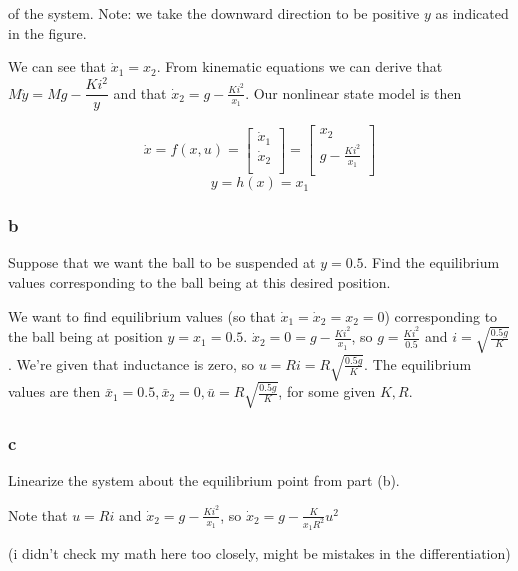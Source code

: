 \documentclass[11pt]{article}
\begin{document}
of the system. Note: we take the downward direction to be positive $y$ as indicated in the figure.

We can see that $\dot x_1 = x_2$. From kinematic equations we can derive that $M \ddot y = Mg - \dfrac{Ki^2}{y}$ and that $\dot x_2 = g - \frac{Ki^2}{x_1}$. Our nonlinear state model is then

\[
    \dot x = f(x, u) =
    \begin{bmatrix}
        \dot x_1 \\
        \dot x_2 \\
    \end{bmatrix}
    =
    \begin{bmatrix}
        x_2 \\
        g - \frac{Ki^2}{x_1} \\
    \end{bmatrix}
\]
\[ y = h(x) = x_1 \]

\subsubsection{b}

Suppose that we want the ball to be suspended at $y = 0.5$. Find the equilibrium values corresponding to the ball being at this desired position.

We want to find equilibrium values (so that $\dot x_1 = \dot x_2 = x_2 = 0$) corresponding to the ball being at position $y = x_1 = 0.5$. $\dot x_2 = 0 = g - \frac{Ki^2}{x_1}$, so $g = \frac{Ki^2}{0.5}$ and $i = \sqrt{\frac{0.5g}{K}}$. We're given that inductance is zero, so $u = Ri = R \sqrt{\frac{0.5g}{K}}$. The equilibrium values are then $\bar x_1 = 0.5, \bar x_2 = 0, \bar u = R \sqrt{\frac{0.5g}{K}}$, for some given $K, R$.

\subsubsection{c}

Linearize the system about the equilibrium point from part (b).

Note that $u = Ri$ and $\dot x_2 = g - \frac{Ki^2}{x_1}$, so $\dot x_2 = g - \frac{K}{x_1 R^2} u^2$

(i didn't check my math here too closely, might be mistakes in the differentiation)
\end{document}
